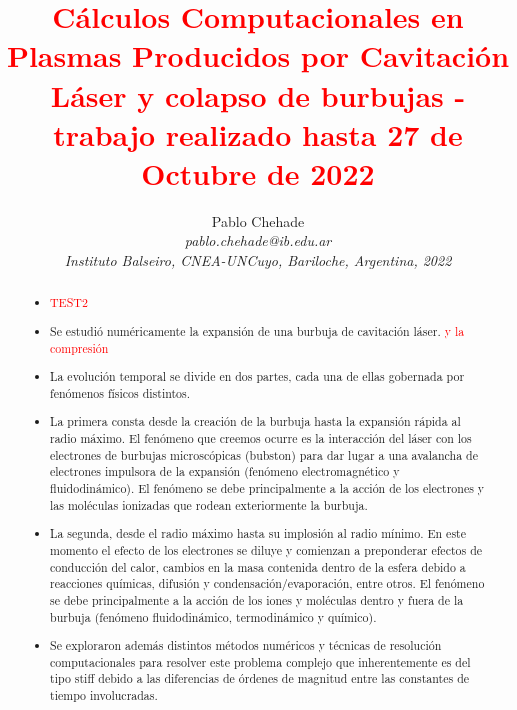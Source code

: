 \documentclass[aps,prb,twocolumn,superscriptaddress,floatfix,longbibliography,10pt]{revtex4-2}
\newcounter{para}
\begin{document}
\newcommand{\mytitle}{\textcolor{red}{Cálculos Computacionales en Plasmas Producidos por Cavitación Láser y colapso de burbujas - trabajo realizado hasta 27 de Octubre de 2022}}

\title{\mytitle}

\author{Pablo Chehade \\
    \small \textit{pablo.chehade@ib.edu.ar} \\
    \small \textit{Instituto Balseiro, CNEA-UNCuyo, Bariloche, Argentina, 2022} \\}


\begin{abstract}
  \begin{itemize}
    \item \textcolor{red}{TEST2}
    \item Se estudió numéricamente la expansión de una burbuja de cavitación láser. \textcolor{red}{y la compresión}
    \item La evolución temporal se divide en dos partes, cada una de ellas gobernada por fenómenos físicos distintos.
    \item La primera consta desde la creación de la burbuja hasta la expansión rápida al radio máximo. El fenómeno que creemos ocurre es la interacción del láser con los electrones de burbujas microscópicas (bubston) para dar lugar a una avalancha de electrones impulsora de la expansión (fenómeno electromagnético y fluidodinámico). El fenómeno se debe principalmente a la acción de los electrones y las moléculas ionizadas que rodean exteriormente la burbuja.
    \item La segunda, desde el radio máximo hasta su implosión al radio mínimo. En este momento el efecto de los electrones se diluye y comienzan a preponderar efectos de conducción del calor, cambios en la masa contenida dentro de la esfera debido a reacciones químicas, difusión y condensación/evaporación, entre otros. El fenómeno se debe principalmente a la acción de los iones y moléculas dentro y fuera de la burbuja (fenómeno fluidodinámico, termodinámico y químico).
    \item Se exploraron además distintos métodos numéricos y técnicas de resolución computacionales para resolver este problema complejo que inherentemente es del tipo stiff debido a las diferencias de órdenes de magnitud entre las constantes de tiempo involucradas.
  \end{itemize}


\end{abstract}
\end{document}
